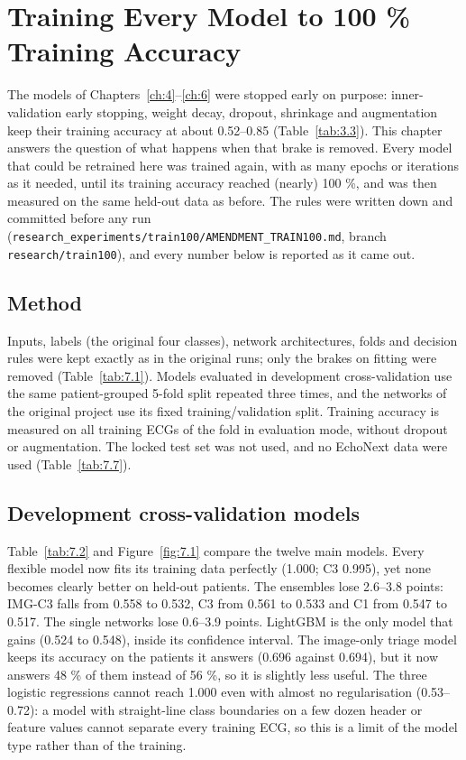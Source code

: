 \chapter{Training Every Model to 100 \% Training Accuracy}\label{ch:7}

The models of Chapters~\ref{ch:4}--\ref{ch:6} were stopped early on purpose: inner-validation early stopping, weight decay, dropout, shrinkage and augmentation keep their training accuracy at about 0.52--0.85 (Table~\ref{tab:3.3}). This chapter answers the question of what happens when that brake is removed. Every model that could be retrained here was trained again, with as many epochs or iterations as it needed, until its training accuracy reached (nearly) 100 \%, and was then measured on the same held-out data as before. The rules were written down and committed before any run (\texttt{research\_experiments/train100/AMENDMENT\_TRAIN100.md}, branch \texttt{research/train100}), and every number below is reported as it came out.

\section{Method}\label{sec:7.1}

Inputs, labels (the original four classes), network architectures, folds and decision rules were kept exactly as in the original runs; only the brakes on fitting were removed (Table~\ref{tab:7.1}). Models evaluated in development cross-validation use the same patient-grouped 5-fold split repeated three times, and the networks of the original project use its fixed training/validation split. Training accuracy is measured on all training ECGs of the fold in evaluation mode, without dropout or augmentation. The locked test set was not used, and no EchoNext data were used (Table~\ref{tab:7.7}).



\section{Development cross-validation models}\label{sec:7.2}

Table~\ref{tab:7.2} and Figure~\ref{fig:7.1} compare the twelve main models. Every flexible model now fits its training data perfectly (1.000; C3 0.995), yet none becomes clearly better on held-out patients. The ensembles lose 2.6--3.8 points: IMG-C3 falls from 0.558 to 0.532, C3 from 0.561 to 0.533 and C1 from 0.547 to 0.517. The single networks lose 0.6--3.9 points. LightGBM is the only model that gains (0.524 to 0.548), inside its confidence interval. The image-only triage model keeps its accuracy on the patients it answers (0.696 against 0.694), but it now answers 48 \% of them instead of 56 \%, so it is slightly less useful. The three logistic regressions cannot reach 1.000 even with almost no regularisation (0.53--0.72): a model with straight-line class boundaries on a few dozen header or feature values cannot separate every training ECG, so this is a limit of the model type rather than of the training.

